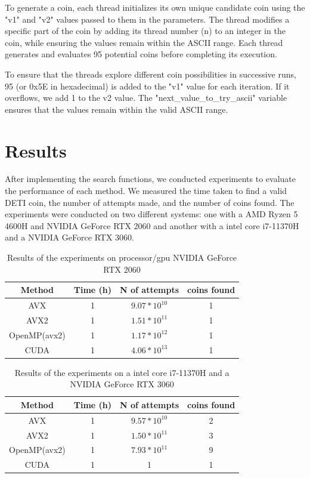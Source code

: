 \documentclass[a4paper,12pt]{article}
\begin{document}
To generate a coin, each thread initializes its own unique candidate coin using the "v1" and "v2" values passed to them in the parameters. The thread modifies a specific part of the coin by adding its thread number (n) to an integer in the coin, while ensuring the values remain within the ASCII range. Each thread generates and evaluates 95 potential coins before completing its execution.

To ensure that the threads explore different coin possibilities in successive runs, 95 (or 0x5E in hexadecimal) is added to the "v1" value for each iteration. If it overflows, we add 1 to the v2 value. The "next\_value\_to\_try\_ascii" variable ensures that the values remain within the valid ASCII range.

\section{Results}
\label{sec:results}

After implementing the search functions, we conducted experiments to evaluate the performance
of each method. We measured the time taken to find a valid DETI coin, the number of attempts
made, and the number of coins found. The experiments were conducted on two different systems:
one with a AMD Ryzen 5 4600H and NVIDIA GeForce RTX 2060 and another with a intel core i7-11370H and a NVIDIA GeForce RTX 
3060.

\begin{table}[H]
    \centering
    \begin{tabular}{|c|c|c|c|}
        \hline
        \textbf{Method} & \textbf{Time (h)} & \textbf{N of attempts} & \textbf{coins found} \\
        \hline
        AVX & 1 & $9.07*10^{10}$ & 1  \\
        AVX2 & 1 & $1.51*10^{11}$ & 1 \\
        OpenMP(avx2) & 1 & $1.17*10^{12}$ & 1 \\
        CUDA & 1 & $4.06*10^{13}$ & 1  \\
        \hline
    \end{tabular}
    \caption{Results of the experiments on processor/gpu NVIDIA GeForce RTX 2060}
    \label{tab:results1}
\end{table}

\begin{table}[H]
    \centering
    \begin{tabular}{|c|c|c|c|}
        \hline
        \textbf{Method} & \textbf{Time (h)} & \textbf{N of attempts} & \textbf{coins found} \\
        \hline
        AVX & 1 & $9.57*10^{10}$ & 2  \\
        AVX2 & 1 &  $1.50*10^{11}$ & 3 \\
        OpenMP(avx2) & 1 & $7.93*10^{11}$ & 9 \\
        CUDA & 1 & 1 & 1  \\
        \hline
    \end{tabular}
    \caption{Results of the experiments on a intel core i7-11370H and a NVIDIA GeForce RTX 3060}
    \label{tab:results2}
\end{table}
\end{document}

